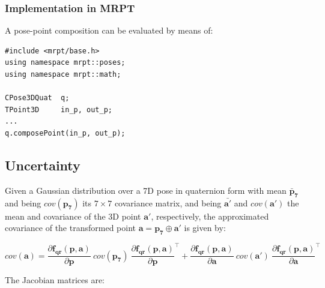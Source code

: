 \documentclass[a4paper,11pt]{report}
\begin{document}
\subsubsection{Implementation in MRPT}

A pose-point composition can be evaluated by means of:

\begin{lstlisting}
#include <mrpt/base.h> 
using namespace mrpt::poses; 
using namespace mrpt::math; 

CPose3DQuat  q;
TPoint3D     in_p, out_p;
...
q.composePoint(in_p, out_p);
\end{lstlisting}


\subsection{Uncertainty}

Given a Gaussian distribution over a 7D pose in quaternion form with 
mean ${\mathbf{\bar{p}_7}}$ and being $cov(\mathbf{p_7})$ its $7 \times 7$ covariance matrix, 
and being ${\mathbf{\bar{a'}}}$ and $cov(\mathbf{a'})$ the mean and covariance of the 3D point 
$\mathbf{a'}$, respectively, the approximated covariance of the transformed point 
$\mathbf{a} = \mathbf{p_7} \oplus \mathbf{a'}$ is given by:

\begin{equation}
cov(\mathbf{a}) =
\frac{\partial \mathbf{f_{qr}} (\mathbf{p},\mathbf{a})}{\partial \mathbf{p}} ~
cov(\mathbf{p_7})  ~
\frac{\partial \mathbf{f_{qr}} (\mathbf{p},\mathbf{a})}{\partial \mathbf{p}}^\top 
+
\frac{\partial \mathbf{f_{qr}} (\mathbf{p},\mathbf{a})}{\partial \mathbf{a}} ~ 
cov(\mathbf{a'})  ~
\frac{\partial \mathbf{f_{qr}} (\mathbf{p},\mathbf{a})}{\partial \mathbf{a}}^\top
\end{equation}


The Jacobian matrices are:
\end{document}
